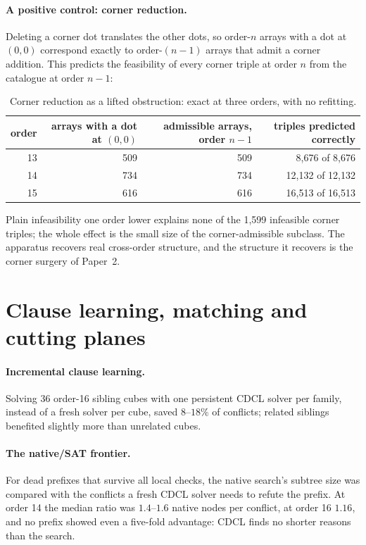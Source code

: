 \paragraph{A positive control: corner reduction.} Deleting a corner dot translates the other dots, so order-$n$
arrays with a dot at $(0,0)$ correspond exactly to order-$(n-1)$ arrays that admit a corner addition. This
predicts the feasibility of every corner triple at order $n$ from the catalogue at order $n-1$:

\begin{table}[H]
\centering
\small
\begin{tabular}{@{}rrrr@{}}
\toprule
order & arrays with a dot at $(0,0)$ & admissible arrays, order $n-1$ & triples predicted correctly \\
\midrule
13 & 509 & 509 & 8{,}676 of 8{,}676 \\
14 & 734 & 734 & 12{,}132 of 12{,}132 \\
15 & 616 & 616 & 16{,}513 of 16{,}513 \\
\bottomrule
\end{tabular}
\caption{Corner reduction as a lifted obstruction: exact at three orders, with no refitting.}
\label{tab:corner}
\end{table}

\noindent Plain infeasibility one order lower explains none of the 1{,}599 infeasible corner triples; the whole
effect is the small size of the corner-admissible subclass. The apparatus recovers real cross-order
structure, and the structure it recovers is the corner surgery of Paper~2.

\section{Clause learning, matching and cutting planes}
\label{sec:proofs}
\paragraph{Incremental clause learning.} Solving 36 order-16 sibling cubes with one persistent CDCL solver
per family, instead of a fresh solver per cube, saved $8$--$18\%$ of conflicts; related siblings benefited
slightly more than unrelated cubes.

\paragraph{The native/SAT frontier.} For dead prefixes that survive all local checks, the native search's
subtree size was compared with the conflicts a fresh CDCL solver needs to refute the prefix. At order 14 the
median ratio was $1.4$--$1.6$ native nodes per conflict, at order 16 $1.16$, and no prefix showed even a
five-fold advantage: CDCL finds no shorter reasons than the search.

